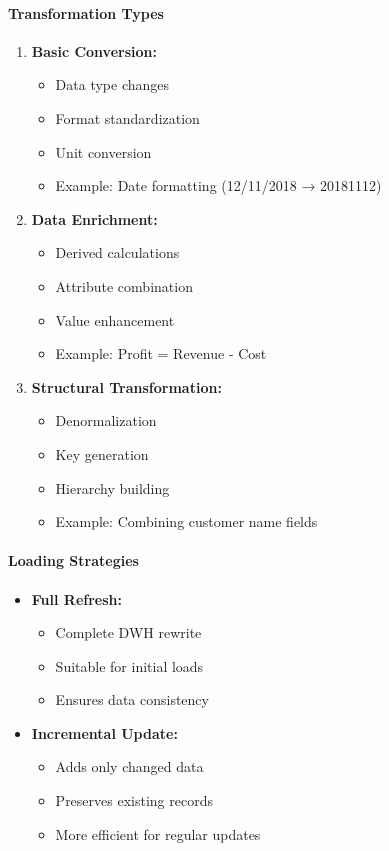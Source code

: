 \documentclass[a4paper,11pt]{article}
\begin{document}
\paragraph{Transformation Types}
\begin{enumerate}
    \item \textbf{Basic Conversion:}
        \begin{itemize}
            \item Data type changes
            \item Format standardization
            \item Unit conversion
            \item Example: Date formatting (12/11/2018 → 20181112)
        \end{itemize}
    \item \textbf{Data Enrichment:}
        \begin{itemize}
            \item Derived calculations
            \item Attribute combination
            \item Value enhancement
            \item Example: Profit = Revenue - Cost
        \end{itemize}
    \item \textbf{Structural Transformation:}
        \begin{itemize}
            \item Denormalization
            \item Key generation
            \item Hierarchy building
            \item Example: Combining customer name fields
        \end{itemize}
\end{enumerate}

\paragraph{Loading Strategies}
\begin{itemize}
    \item \textbf{Full Refresh:}
        \begin{itemize}
            \item Complete DWH rewrite
            \item Suitable for initial loads
            \item Ensures data consistency
        \end{itemize}
    \item \textbf{Incremental Update:}
        \begin{itemize}
            \item Adds only changed data
            \item Preserves existing records
            \item More efficient for regular updates
        \end{itemize}
\end{itemize}
\end{document}
